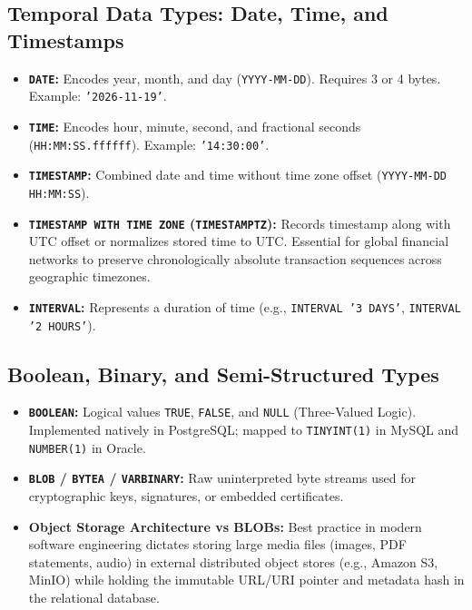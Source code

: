 \subsection{Temporal Data Types: Date, Time, and Timestamps}
\begin{itemize}
    \item \textbf{\texttt{DATE}:} Encodes year, month, and day (\texttt{YYYY-MM-DD}). Requires 3 or 4 bytes. Example: \texttt{'2026-11-19'}.
    \item \textbf{\texttt{TIME}:} Encodes hour, minute, second, and fractional seconds (\texttt{HH:MM:SS.ffffff}). Example: \texttt{'14:30:00'}.
    \item \textbf{\texttt{TIMESTAMP}:} Combined date and time without time zone offset (\texttt{YYYY-MM-DD HH:MM:SS}).
    \item \textbf{\texttt{TIMESTAMP WITH TIME ZONE} (\texttt{TIMESTAMPTZ}):} Records timestamp along with UTC offset or normalizes stored time to UTC. Essential for global financial networks to preserve chronologically absolute transaction sequences across geographic timezones.
    \item \textbf{\texttt{INTERVAL}:} Represents a duration of time (e.g., \texttt{INTERVAL '3 DAYS'}, \texttt{INTERVAL '2 HOURS'}).
\end{itemize}

\subsection{Boolean, Binary, and Semi-Structured Types}
\begin{itemize}
    \item \textbf{\texttt{BOOLEAN}:} Logical values \texttt{TRUE}, \texttt{FALSE}, and \texttt{NULL} (Three-Valued Logic). Implemented natively in PostgreSQL; mapped to \texttt{TINYINT(1)} in MySQL and \texttt{NUMBER(1)} in Oracle.
    \item \textbf{\texttt{BLOB} / \texttt{BYTEA} / \texttt{VARBINARY}:} Raw uninterpreted byte streams used for cryptographic keys, signatures, or embedded certificates.
    \item \textbf{Object Storage Architecture vs BLOBs:} Best practice in modern software engineering dictates storing large media files (images, PDF statements, audio) in external distributed object stores (e.g., Amazon S3, MinIO) while holding the immutable URL/URI pointer and metadata hash in the relational database.
\end{itemize}

